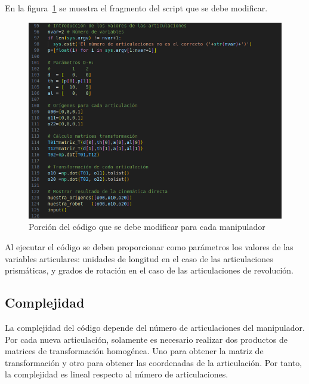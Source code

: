 En la figura~\ref{chapter:intro2} se muestra el fragmento del script que se debe modificar.
\begin{figure}[htb]
   \centering
   \includegraphics[width=1\linewidth]{images/cin_dir_1.png}
   \caption{Porción del código que se debe modificar para cada manipulador}
   \label{chapter:intro2}
\end{figure}

\bigskip Al ejecutar el código se deben proporcionar como parámetros los valores de las variables articulares: unidades de longitud en el caso de las articulaciones prismáticas, y grados de rotación en el caso de las articulaciones de revolución. 

\subsection{Complejidad}
La complejidad del código depende del número de articulaciones del manipulador. Por cada nueva articulación, solamente es necesario realizar dos productos de matrices de transformación homogénea. Uno para obtener la matriz de transformación y otro para obtener las coordenadas de la articulación. Por tanto, la complejidad es lineal respecto al número de articulaciones.
